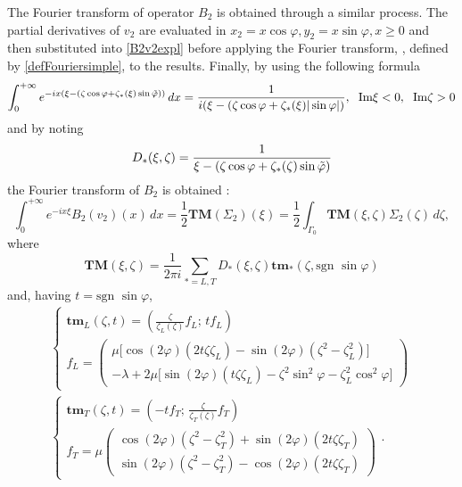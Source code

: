 The Fourier transform of operator $B_2$ is obtained  through a similar process. The partial derivatives of $v_2$ are evaluated in $x_2=x\cos\varphi,y_2=x\sin\varphi,x\geq0$ and then substituted into \eqref{B2v2expl} before applying the Fourier transform, , defined by \eqref{defFouriersimple}, to the results. Finally, by using the following formula
\begin{equation}
\int_0^{+\infty} e^{-ix(\xi-(\zeta \cos \varphi + \zeta_*(\xi) \sin\tilde{\varphi}))}\,dx=\frac{1}{i(\xi-(\zeta \cos \varphi + \zeta_*(\xi)| \sin \varphi|)}, \; \mbox{ Im}\xi <0, \;  \mbox{ Im} \zeta>0 
\end{equation}
and by noting
\begin{equation}
D_*(\xi,\zeta)=\frac{1}{\xi-(\zeta \cos \varphi + \zeta_*(\zeta) \sin\tilde{\varphi})}
\end{equation}
the Fourier transform of $B_2$ is obtained :
\begin{equation}
\int_0^{+\infty} e^{-ix\xi}B_2(v_2)(x)\,dx=\frac{1}{2}\textbf{TM}(\Sigma_2)(\xi) =\frac{1}{2} \int_{\Gamma_0}\textbf{TM}(\xi,\zeta)\Sigma_2(\zeta)\,d\zeta,
\label{B2TM}
\end{equation}
where
\begin{equation}
\textbf{TM}(\xi,\zeta)=\frac{1}{2\pi i}\sum_{*=L,T}D_*(\xi,\zeta)\textbf{tm}_*(\zeta,\mbox{sgn } \sin \varphi)
\label{defTM}
\end{equation}
and, having $t = \mbox{sgn } \sin \varphi$,
\begin{gather}
\left\{
\begin{matrix}
\textbf{tm}_L(\zeta,t)=\left( \frac{\zeta}{\zeta_L(\zeta)}f_L ; \, tf_L \right) \\
f_L = \begin{pmatrix}
\mu \lbrack \cos(2\varphi)(2t\zeta\zeta_L)-\sin(2\varphi)(\zeta^2-\zeta_L^2) \rbrack \\
-\lambda+2\mu\lbrack \sin(2\varphi)(t\zeta\zeta_L) -\zeta^2 \sin^2\varphi-\zeta_L^2\cos^2\varphi \rbrack
\end{pmatrix}
\end{matrix}
\right. \label{tmL}
\\
\left\{
\begin{matrix}
\textbf{tm}_T(\zeta,t)=\left(-tf_T; \, \frac{\zeta}{\zeta_T(\zeta)} f_T\right) \\
f_T=\mu \begin{pmatrix}
\cos(2\varphi)(\zeta^2-\zeta^2_T)+\sin(2\varphi)(2t\zeta\zeta_T)\\
\sin(2\varphi)(\zeta^2-\zeta^2_T)-\cos(2\varphi)(2t\zeta\zeta_T)
\end{pmatrix}
\end{matrix}
\right. .
\label{tmT}
\end{gather}

